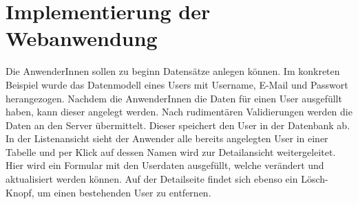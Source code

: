\chapter{Implementierung der Webanwendung}



Die AnwenderInnen sollen zu beginn Datensätze anlegen können. Im konkreten Beispiel wurde das Datenmodell eines Users mit Username, E-Mail und Passwort herangezogen.
Nachdem die AnwenderInnen die Daten für einen User ausgefüllt haben, kann dieser angelegt werden. Nach rudimentären Validierungen werden die Daten an den Server übermittelt. Dieser speichert den User in der Datenbank ab. 
In der Listenansicht sieht der Anwender alle bereits angelegten User in einer Tabelle und per Klick auf dessen Namen wird zur Detailansicht weitergeleitet. Hier wird ein Formular mit den Userdaten ausgefüllt, welche verändert und aktualisiert werden können.   
Auf der Detailseite findet sich ebenso ein Lösch-Knopf, um einen bestehenden User zu entfernen.
